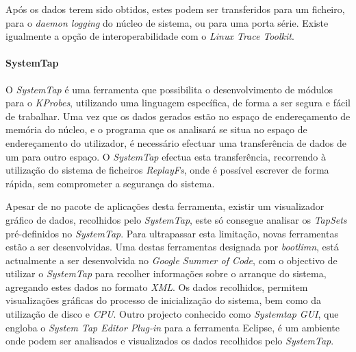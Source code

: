 Após os dados terem sido obtidos, estes podem ser transferidos para um ficheiro, para o \textit{daemon logging} do núcleo de sistema, ou para uma porta série.
Existe igualmente a opção de interoperabilidade com o \textit{Linux Trace Toolkit}\cite{DProbes}.

\paragraph*{SystemTap}
O \textit{SystemTap} é uma ferramenta que possibilita o desenvolvimento de módulos para o \textit{KProbes}, utilizando uma linguagem específica, de forma a ser segura e fácil de trabalhar.
Uma vez que os dados gerados estão no espaço de endereçamento de memória do núcleo, e o programa que os analisará se situa no espaço de endereçamento do utilizador, é necessário efectuar uma transferência de dados de um para outro espaço.
O \textit{SystemTap} efectua esta transferência, recorrendo à utilização do sistema de ficheiros \textit{ReplayFs}, onde é possível escrever de forma rápida, sem comprometer a segurança do sistema\cite{Donovan2007,Jones2009}.

Apesar de no pacote de aplicações desta ferramenta, existir um visualizador gráfico de dados, recolhidos pelo \textit{SystemTap}, este só consegue analisar os \textit{TapSets} pré-definidos no \textit{SystemTap}.
Para ultrapassar esta limitação, novas ferramentas estão a ser desenvolvidas.
Uma destas ferramentas designada por \textit{bootlimn}, está actualmente a ser desenvolvida no \textit{Google Summer of Code}, com o objectivo de utilizar o \textit{SystemTap} para recolher informações sobre o arranque do sistema, agregando estes dados no formato \textit{XML}.
Os dados recolhidos, permitem visualizações gráficas do processo de inicialização do sistema, bem como da utilização de disco e \textit{CPU}.
Outro projecto conhecido como \textit{Systemtap GUI}, que engloba o \textit{System Tap Editor Plug-in} para a ferramenta Eclipse, é um ambiente onde podem ser analisados e visualizados os dados recolhidos pelo \textit{SystemTap}.



